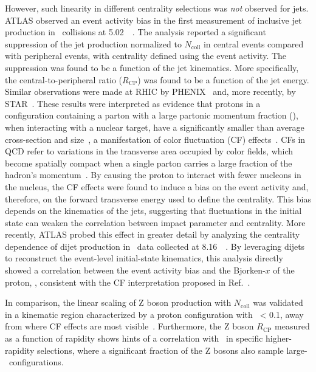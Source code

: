 \documentclass[PAPER, atlasdraft=false, USenglish, cernpreprint]{atlasdoc}
\begin{document}
However, such linearity in different centrality selections was \textit{not} observed for jets.
ATLAS observed an event activity bias in the first measurement of inclusive jet production in \pxPb\ collisions at 5.02~\TeV ~\cite{ATLAS:2014cpa}. 
The analysis reported a significant suppression of the jet production normalized to $N_{\mathrm{coll}}$ in central events compared with peripheral events, with centrality defined using the event activity. The suppression was found to be a function of the jet kinematics.  More specifically, the central-to-peripheral ratio ($R_{\mathrm{CP}}$) was found to be a function of the jet energy. Similar observations were made at RHIC by PHENIX~\cite{PHENIX:2015fgy} and, more recently, by STAR~\cite{STAR:2024nwm}.
These results were interpreted as evidence that protons in a configuration containing a parton with a large partonic momentum fraction (\bjork),  when interacting with a nuclear target,  have a significantly smaller than average cross-section and size~\cite{Alvioli:2017wou}, a manifestation of color fluctuation (CF) effects~\cite{Mueller:1982, Brodsky:1982, PhysRevLett.47.297}. 
CFs in QCD refer to variations in the transverse area occupied by color fields, which become spatially compact when a single parton carries a large fraction of the hadron’s momentum~\cite{Brodsky:2022bum}.
By causing the proton to interact with fewer nucleons in the nucleus, the CF effects were found to induce a bias on the event activity and, therefore, on the forward transverse energy used to define the centrality. This bias depends on the kinematics of the jets, suggesting that fluctuations in the initial state can weaken the correlation between impact parameter and centrality.
More recently, ATLAS probed this effect in greater detail by analyzing the centrality dependence of dijet production in \pxPb\ data collected at 8.16~\TeV~\cite{ATLAS:2023zfx}.
By leveraging dijets to reconstruct the event-level initial-state kinematics, this analysis directly showed a correlation between the event activity bias and the Bjorken-$x$ of the proton, \xp, consistent with the CF interpretation proposed in Ref.~\cite{Alvioli:2017wou}.  


In comparison, the linear scaling of Z boson production with $N_{\mathrm{coll}}$ was validated in a kinematic region characterized by a proton configuration with \xp\ < 0.1, away from where CF effects are most visible~\cite{HION-2013-09}. Furthermore, the Z boson $R_{\mathrm{CP}}$ measured as a function of rapidity shows hints of a correlation with \xp\ in specific higher-rapidity selections, where a significant fraction of the Z bosons also sample large-\xp\ configurations.
\end{document}
